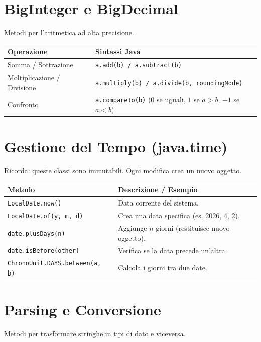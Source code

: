 \section{BigInteger e BigDecimal}
Metodi per l'aritmetica ad alta precisione.

\begin{table}[ht!]
\centering
\begin{tabularx}{\textwidth}{@{}lX@{}}
\toprule
\textbf{Operazione} & \textbf{Sintassi Java} \\ \midrule
Somma / Sottrazione & \texttt{a.add(b) / a.subtract(b)} \\
Moltiplicazione / Divisione & \texttt{a.multiply(b) / a.divide(b, roundingMode)} \\
Confronto & \texttt{a.compareTo(b)} ($0$ se uguali, $1$ se $a>b$, $-1$ se $a<b$) \\ \bottomrule
\end{tabularx}
\end{table}

\section{Gestione del Tempo (java.time)}
Ricorda: queste classi sono immutabili. Ogni modifica crea un nuovo oggetto.

\begin{table}[ht!]
\centering
\begin{tabularx}{\textwidth}{@{}lX@{}}
\toprule
\textbf{Metodo} & \textbf{Descrizione / Esempio} \\ \midrule
\texttt{LocalDate.now()} & Data corrente del sistema. \\
\texttt{LocalDate.of(y, m, d)} & Crea una data specifica (es. 2026, 4, 2). \\
\texttt{date.plusDays(n)} & Aggiunge $n$ giorni (restituisce nuovo oggetto). \\
\texttt{date.isBefore(other)} & Verifica se la data precede un'altra. \\
\texttt{ChronoUnit.DAYS.between(a, b)} & Calcola i giorni tra due date. \\ \bottomrule
\end{tabularx}
\end{table}

\section{Parsing e Conversione}
Metodi per trasformare stringhe in tipi di dato e viceversa.

